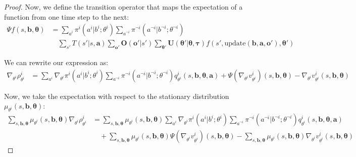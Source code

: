 \documentclass[a4paper,12pt]{report}
\begin{document}
\begin{proof}
    Now, we define the transition operator that maps the expectation of a function
    from one time step to the next:
    \begin{align}
        \Psi f(s, \boldsymbol{b}, \boldsymbol{\theta}) & = \sum_{a^i}\pi^{i}(a^{i}|b^{i}; \theta^{i}) \sum_{a^{\neg i}}\pi^{\neg i}(a^{\neg i}|b^{\neg i}; \theta^{\neg i})                                                                                                                                                                                 \\
                                                       & \quad \sum_{s'}T(s'|s, \boldsymbol{a}) \sum_{\boldsymbol{o}'}\boldsymbol{O}(\boldsymbol{o}'|s') \sum_{\boldsymbol{\theta}'}\boldsymbol{U}(\boldsymbol{\theta}'|\boldsymbol{\theta}, \boldsymbol{\tau}) f(s', \text{update}(\boldsymbol{b}, \boldsymbol{a}, \boldsymbol{o}'), \boldsymbol{\theta}')
    \end{align}

    We can rewrite our expression as:
    \begin{align}
        \nabla_{\theta^i}\rho^{i}_{\theta^i} & = \sum_{a^i}\nabla_{\theta^i}\pi^{i}(a^{i}|b^{i}; \theta^{i}) \sum_{a^{\neg i}}\pi^{\neg i}(a^{\neg i}|b^{\neg i}; \theta^{\neg i}) q^{i}_{\theta^i}(s, \boldsymbol{b}, \boldsymbol{\theta}, \boldsymbol{a}) + \Psi(\nabla_{\theta^i}v^{i}_{\theta^i})(s, \boldsymbol{b}, \boldsymbol{\theta}) - \nabla_{\theta^i}v^{i}_{\theta^i}(s, \boldsymbol{b}, \boldsymbol{\theta})
    \end{align}

    Now, we take the expectation with respect to the stationary distribution
    $\mu_{\theta^i}(s, \boldsymbol{b}, \boldsymbol{\theta})$:
    \begin{align}
        \sum_{s, \boldsymbol{b}, \boldsymbol{\theta}}\mu_{\theta^i}(s, \boldsymbol{b}, \boldsymbol{\theta}) \nabla_{\theta^i}\rho^{i}_{\theta^i} & = \sum_{s, \boldsymbol{b}, \boldsymbol{\theta}}\mu_{\theta^i}(s, \boldsymbol{b}, \boldsymbol{\theta}) \sum_{a^i}\nabla_{\theta^i}\pi^{i}(a^{i}|b^{i}; \theta^{i}) \sum_{a^{\neg i}}\pi^{\neg i}(a^{\neg i}|b^{\neg i}; \theta^{\neg i}) q^{i}_{\theta^i}(s, \boldsymbol{b}, \boldsymbol{\theta}, \boldsymbol{a})                                                            \\
                                                                                                                                                 & \quad + \sum_{s, \boldsymbol{b}, \boldsymbol{\theta}}\mu_{\theta^i}(s, \boldsymbol{b}, \boldsymbol{\theta}) \Psi(\nabla_{\theta^i}v^{i}_{\theta^i})(s, \boldsymbol{b}, \boldsymbol{\theta}) - \sum_{s, \boldsymbol{b}, \boldsymbol{\theta}}\mu_{\theta^i}(s, \boldsymbol{b}, \boldsymbol{\theta}) \nabla_{\theta^i}v^{i}_{\theta^i}(s, \boldsymbol{b}, \boldsymbol{\theta})
    \end{align}


\end{proof}
\end{document}
